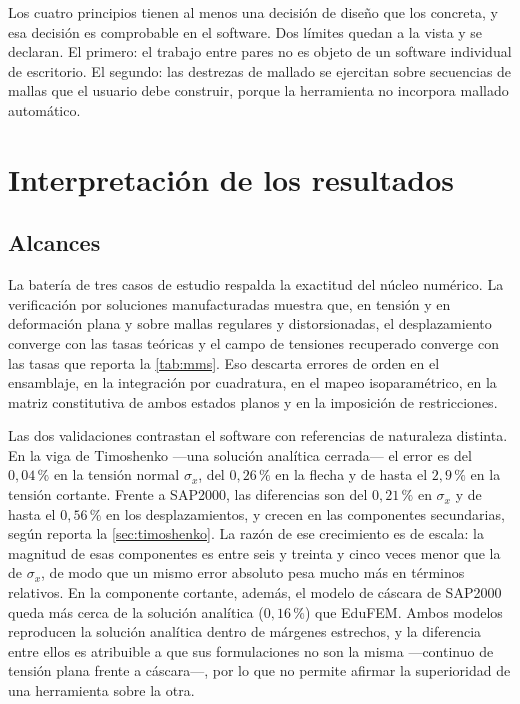 Los cuatro principios tienen al menos una decisión de diseño que los concreta, y esa decisión es comprobable en el software. Dos límites quedan a la vista y se declaran. El primero: el trabajo entre pares no es objeto de un software individual de escritorio. El segundo: las destrezas de mallado se ejercitan sobre secuencias de mallas que el usuario debe construir, porque la herramienta no incorpora mallado automático.

\section{Interpretación de los resultados}
\label{sec:interpretacion}

\subsection{Alcances}

La batería de tres casos de estudio respalda la exactitud del núcleo numérico. La verificación por soluciones manufacturadas muestra que, en tensión y en deformación plana y sobre mallas regulares y distorsionadas, el desplazamiento converge con las tasas teóricas y el campo de tensiones recuperado converge con las tasas que reporta la \autoref{tab:mms}. Eso descarta errores de orden en el ensamblaje, en la integración por cuadratura, en el mapeo isoparamétrico, en la matriz constitutiva de ambos estados planos y en la imposición de restricciones.

Las dos validaciones contrastan el software con referencias de naturaleza distinta. En la viga de Timoshenko —una solución analítica cerrada— el error es del $0{,}04\,\%$ en la tensión normal $\sigma_x$, del $0{,}26\,\%$ en la flecha y de hasta el $2{,}9\,\%$ en la tensión cortante. Frente a SAP2000, las diferencias son del $0{,}21\,\%$ en $\sigma_x$ y de hasta el $0{,}56\,\%$ en los desplazamientos, y crecen en las componentes secundarias, según reporta la \autoref{sec:timoshenko}. La razón de ese crecimiento es de escala: la magnitud de esas componentes es entre seis y treinta y cinco veces menor que la de $\sigma_x$, de modo que un mismo error absoluto pesa mucho más en términos relativos. En la componente cortante, además, el modelo de cáscara de SAP2000 queda más cerca de la solución analítica ($0{,}16\,\%$) que EduFEM. Ambos modelos reproducen la solución analítica dentro de márgenes estrechos, y la diferencia entre ellos es atribuible a que sus formulaciones no son la misma —continuo de tensión plana frente a cáscara—, por lo que no permite afirmar la superioridad de una herramienta sobre la otra.

